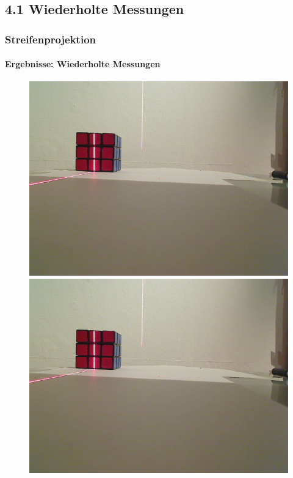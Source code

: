 \documentclass{beamer}
\begin{document}
\subsection{4.1 \hspace{5px} Wiederholte Messungen}
\begin{frame}
	\frametitle{Streifenprojektion}
	\framesubtitle{Ergebnisse: Wiederholte Messungen}
	
	\begin{figure}
		\begin{minipage}{0.32\linewidth}
			\includegraphics[width=\linewidth]{includes/test_repeat_1}
		\end{minipage}
		\hfill
		\begin{minipage}{0.32\linewidth}
			\includegraphics[width=\linewidth]{includes/test_repeat_2}

\end{minipage}
\end{figure}
\end{frame}
\end{document}
